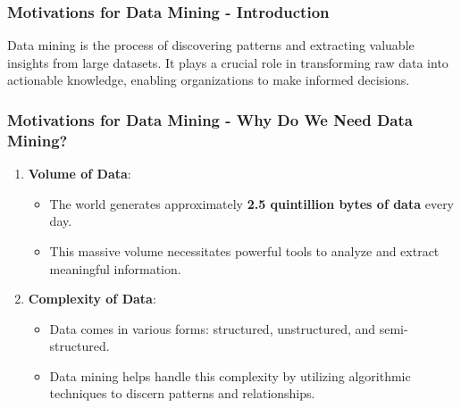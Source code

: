 \documentclass[aspectratio=169]{beamer}
\begin{document}
\begin{frame}[fragile]
  \frametitle{Motivations for Data Mining - Introduction}
  Data mining is the process of discovering patterns and extracting valuable insights from large datasets. It plays a crucial role in transforming raw data into actionable knowledge, enabling organizations to make informed decisions.
\end{frame}

\begin{frame}[fragile]
  \frametitle{Motivations for Data Mining - Why Do We Need Data Mining?}
  \begin{enumerate}
    \item \textbf{Volume of Data}:
      \begin{itemize}
        \item The world generates approximately \textbf{2.5 quintillion bytes of data} every day.
        \item This massive volume necessitates powerful tools to analyze and extract meaningful information.
      \end{itemize}
      
    \item \textbf{Complexity of Data}:
      \begin{itemize}
        \item Data comes in various forms: structured, unstructured, and semi-structured.
        \item Data mining helps handle this complexity by utilizing algorithmic techniques to discern patterns and relationships.
      \end{itemize}
  \end{enumerate}
\end{frame}
\end{document}
